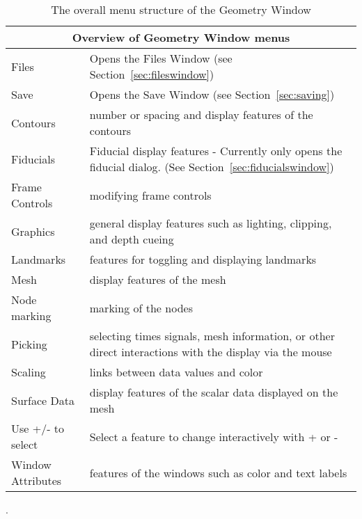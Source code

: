 \begin{table}[ht]
  \begin{center}
    \begin{tabular}{|l|p{4in}|} \hline
      \multicolumn{2}{|c|}{\textbf{Overview of Geometry Window menus}} \\
      \hline \hline 
      Files & Opens the Files Window (see Section~\ref{sec:fileswindow}) \\
      Save & Opens the Save Window (see Section~\ref{sec:saving})  \\
      Contours & number or spacing and display features of the contours \\
      Fiducials & Fiducial display features - Currently only opens the fiducial
        dialog.  (See Section~\ref{sec:fiducialswindow})\\
      Frame Controls & modifying frame controls\\
      Graphics & general display features such as lighting, clipping,
        and depth cueing \\
      Landmarks & features for toggling and displaying landmarks \\ 
      Mesh & display features of the mesh \\
      Node marking & marking of the nodes \\
      Picking & selecting times signals, mesh information, or other direct
      interactions with the display via the mouse\\
      Scaling & links between data values and color\\
      Surface Data & display features of the scalar data displayed on the
      mesh \\  
      Use +/- to select & Select a feature to change interactively with + or -
      \\
      Window Attributes & features of the windows such as color and text
      labels \\ \hline
    \end{tabular}
  \end{center}
\caption{The overall menu structure of the Geometry Window}.
\end{table}


